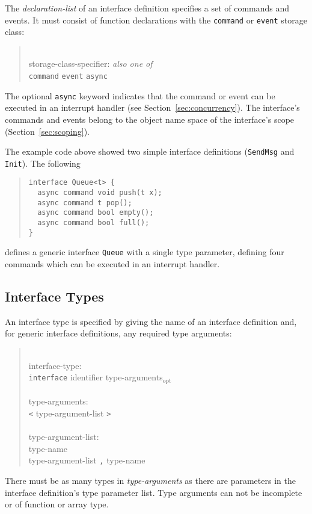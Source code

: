 \documentclass[11pt,letterpaper]{article}
\newcommand{\kw}[1]{{\tt #1}}
\newcommand{\code}[1]{{\tt #1}}
\newcommand{\opt}{$_{\mbox{opt}}$\xspace}
\newcommand{\grammarshift}{\vspace*{-.7cm}}
\newcommand{\grammarindent}{\hspace*{2cm}\= \\ \kill}
\begin{document}
The \emph{declaration-list} of an interface definition specifies a set of
commands and events. It must consist of function declarations with the
\kw{command} or \kw{event} storage class:
\begin{quote} \grammarshift
\em \begin{tabbing}
\grammarindent
storage-class-specifier: \emph{also one of}\\
\>	\kw{command} \kw{event} \kw{async}\\
\end{tabbing}
\end{quote}
The optional \kw{async} keyword indicates that the command or event can be
executed in an interrupt handler (see Section~\ref{sec:concurrency}). The
interface's commands and events belong to the object name space of the
interface's scope (Section~\ref{sec:scoping}).


The example code above showed two simple interface definitions
(\code{SendMsg} and \code{Init}). The following
\begin{quote} \begin{verbatim}
interface Queue<t> { 
  async command void push(t x);
  async command t pop();
  async command bool empty();
  async command bool full();
}
\end{verbatim} \end{quote}
defines a generic interface \code{Queue} with a single type parameter,
defining four commands which can be executed in an interrupt handler.

\subsection{Interface Types}

An interface type is specified by giving the name of an interface 
definition and, for generic interface definitions, any required type
arguments:
\begin{quote} \grammarshift
\em \begin{tabbing}
\grammarindent
interface-type: \\
\>	\kw{interface} identifier type-arguments\opt\\
\\
type-arguments:\\
\>	\kw{<} type-argument-list \kw{>}\\
\\
type-argument-list:\\
\>	type-name\\
\>	type-argument-list \kw{,} type-name
\end{tabbing} \end{quote}
There must be as many types in \emph{type-arguments} as there are
parameters in the interface definition's type parameter list.
Type arguments can not be incomplete or of function or array type.
\end{document}
